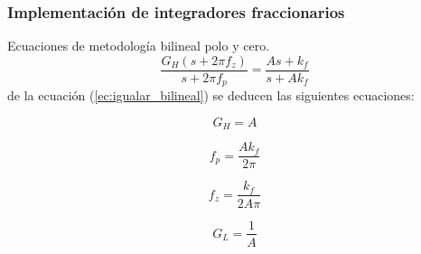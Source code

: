 \documentclass[10pt]{beamer}
\begin{document}
	\begin{frame}
		\frametitle{Implementación de integradores fraccionarios}
		\begin{block}{Ecuaciones de metodología bilineal polo y cero.}
			 \begin{equation}
	 \frac{G_{H}(s + 2 \pi f_{z})}{s + 2 \pi f_{p}} = \frac{As + k_{f}}{s + A k_{f}}
	 \label{ec:igualar_bilineal}
	 \end{equation}
	 de la ecuación (\ref{ec:igualar_bilineal}) se deducen las siguientes ecuaciones:
	 
	 \begin{equation}
		 G_{H} = A
		 \label{ec:bilineal_gh}
	 \end{equation}
	 
	 \begin{equation}
	 	f_{p} = \frac{A k_{f}}{2 \pi}
	 	\label{ec:bilineal_fp}
	 \end{equation}
	 
	 \begin{equation}
		f_{z} = \frac{k_{f}}{ 2A \pi}
		\label{ec:bilineal_fz}
	 \end{equation}
	 
	 \begin{equation}
	 G_{L} = \frac{1}{A}
	 \label{ec:bilineal_gl}
	 \end{equation}
		\end{block}
	\end{frame}
\end{document}

